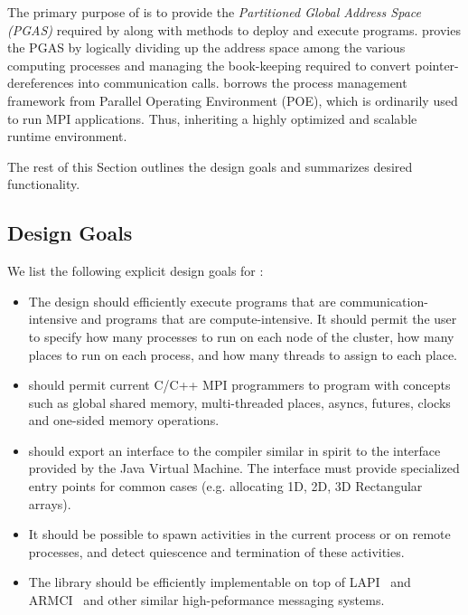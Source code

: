 The primary purpose of \Xtenlib{} is to provide the \textit{Partitioned
Global Address Space (PGAS)} required by \Xten{} along with methods to
deploy and execute \Xten{} programs. \Xtenlib{} provies the PGAS by
logically dividing up the address space among the various computing
processes and managing the book-keeping required to convert
pointer-dereferences into communication calls. \Xtenlib{} borrows the
process management framework from Parallel Operating Environment (POE),
which is ordinarily used to run MPI applications. Thus, inheriting a
highly optimized and scalable runtime environment.

The rest of this Section outlines the design goals and summarizes
desired functionality.

\subsection{Design Goals}

We list the following explicit design goals for \Xtenlib:

\begin{itemize}

	\item The design should efficiently execute programs that are
		communication-intensive and programs that are
		compute-intensive. It should permit the user to specify
		how many processes to run on each node of the cluster,
		how many places to run on each process, and how many
		threads to assign to each place.

	\item \Xtenlib{} should permit current C/C++ MPI programmers to
		program with \Xten{} concepts such as global shared memory,
		multi-threaded places, asyncs, futures, clocks and one-sided memory
		operations.

	\item \Xtenlib{} should export an interface to the compiler
		similar in spirit to the interface provided by the Java Virtual
		Machine. The interface must provide specialized entry points for
		common cases (e.g.{} allocating 1D, 2D, 3D Rectangular arrays).

	\item It should be possible to spawn activities in the current 
		process or on remote processes, and detect quiescence and
		termination of these activities.

	\item The library should be efficiently implementable on top of
		LAPI~\cite{LAPI} and ARMCI~\cite{ARMCI} and other similar
		high-peformance messaging systems.

\end{itemize}

